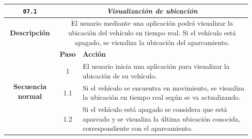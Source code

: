 \begin{table}[H]
  \centering
  \begin{tabularx}{\textwidth}{|c|c|X|}
    \hline
    \texttt{07.1}                               & \multicolumn{2}{c|}{\textit{Visualización de ubicación}}                                                                                                                                                                                                                                                                                                        \\
    \hline
    \textbf{Descripción}                        & \multicolumn{2}{X|}{El usuario mediante una aplicación podrá visualizar la ubicación del vehículo en tiempo real. Si el vehículo está apagado, se visualiza la ubicación del aparcamiento.}                                                                                                                                                                     \\
    \hline
    \multirow{10}{*}{\textbf{Secuencia normal}} & \textbf{Paso}                                                                                                                                                                               & \textbf{Acción}                                                                                                                                                   \\
    \cline{2-3}
                                                & 1                                                                                                                                                                                           & \multicolumn{1}{L|}{El usuario inicia una aplicación para visualizar la ubicación de su vehículo.}                                                                \\
    \cline{2-3}
                                                & 1.1                                                                                                                                                                                         & \multicolumn{1}{L|}{Si el vehículo se encuentra en movimiento, se visualiza la ubicación en tiempo real según se va actualizando.}                                \\
    \cline{2-3}
                                                & 1.2                                                                                                                                                                                         & \multicolumn{1}{L|}{Si el vehículo está apagado se considera que está aparcado y se visualiza la última ubicación conocida, correspondiente con el aparcamiento.} \\

\end{tabularx}
\end{table}
